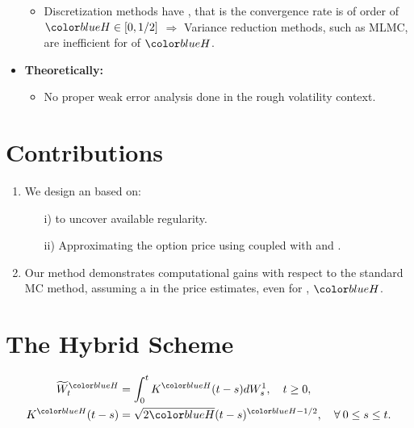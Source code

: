 \documentclass[ima, 20pt, portrait, plainboxedsections]{sciposter}
\begin{document}
\begin{multicols}{3}
\begin{itemize}
\begin{itemize}
\item 	Discretization methods have , that is the convergence rate is of order of $\blue{H} \in[0,1/2]$ \cite{neuenkirch2016order} $\Rightarrow$ Variance reduction methods, such as MLMC, are inefficient for  of $\blue{H}$.
	\end{itemize}

\item \textbf{Theoretically:} 
\begin{itemize}
\item No proper weak error analysis done in the rough volatility
context.
\end{itemize}
\end{itemize}
\section*{Contributions}
\begin{enumerate}		
		\item We design an  based on:
		\begin{enumerate}
			\item[i)] \textbf{}  to uncover available regularity.
			\item[ii)] Approximating the option price using \textbf{} coupled with \textbf{} and \textbf{}.
		\end{enumerate} 
	\item Our  method demonstrates  computational gains with respect to the standard MC method, assuming a  in the price estimates, even for , $\blue{H}$.		
		\end{enumerate}
\section*{The Hybrid Scheme \cite{bennedsen2017hybrid}}
\begin{align*}
	\widetilde{W}_t^{\blue{H}} &= \int_0^t K^{\blue{H}}(t-s) dW_s^1, \quad t \ge 0, \\ 	K^{\blue{H}}(t-s) &= \sqrt{2\blue{H}} (t-s)^{\blue{H} - 1/2},\quad \forall \: 0 \le s \le t. 
	\end{align*}
\begin{itemize}


\end{itemize}
\end{multicols}
\end{document}
